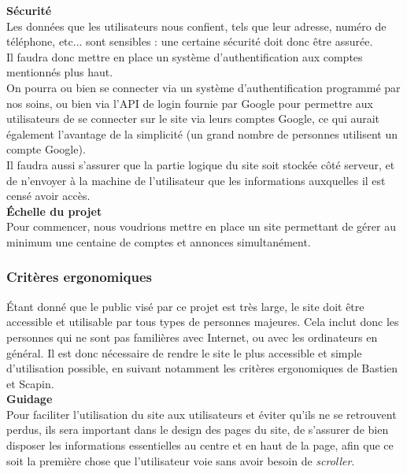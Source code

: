 \documentclass[a4paper,11pt]{article}
\begin{document}
\textbf{Sécurité}\\

Les données que les utilisateurs nous confient, tels que leur adresse, numéro de téléphone, etc... sont
sensibles : une certaine sécurité doit donc être assurée.\\

Il faudra donc mettre en place un système d'authentification aux comptes mentionnés plus haut.\\

On pourra ou bien se connecter via un système d'authentification programmé par nos soins, ou bien via l'API de login fournie par Google pour permettre aux utilisateurs de se connecter sur le site via leurs comptes Google, ce qui aurait également l'avantage de la simplicité (un grand nombre de personnes utilisent un compte Google).\\

Il faudra aussi s'assurer que la partie logique du site soit stockée côté serveur, et de n'envoyer à la machine de l'utilisateur que les informations auxquelles il est censé avoir accès.\\

\textbf{Échelle du projet}\\

Pour commencer, nous voudrions mettre en place un site permettant de gérer au minimum une centaine de comptes et annonces simultanément.\\

\subsubsection{Critères ergonomiques}

Étant donné que le public visé par ce projet est très large, le site doit être accessible et utilisable par
tous types de personnes majeures. Cela inclut donc les personnes qui ne sont pas familières avec Internet, ou
avec les ordinateurs en général. Il est donc nécessaire de rendre le site le plus accessible et simple d'utilisation
possible, en suivant notamment les critères ergonomiques de Bastien et Scapin.\\

\textbf{Guidage}\\

Pour faciliter l'utilisation du site aux utilisateurs et éviter qu'ils ne se retrouvent perdus, ils sera important dans le design des pages du site, de s'assurer de bien disposer les informations essentielles au centre et en haut de la page, afin que ce soit la première chose que l'utilisateur voie sans avoir besoin de \textit{scroller}.\\
\end{document}
